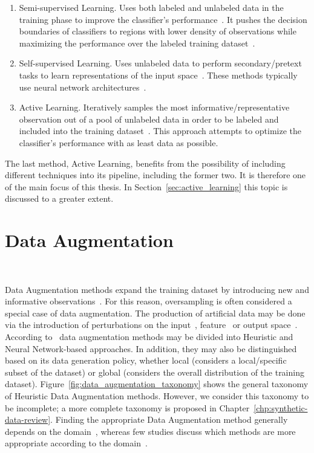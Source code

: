 \begin{enumerate}
    \item Semi-supervised Learning. Uses both labeled and unlabeled data in
        the training phase to improve the classifier's
        performance~\cite{ouali2020overview}. It pushes the decision
        boundaries of classifiers to regions with lower density of
        observations while maximizing the performance over the labeled
        training dataset~\cite{chapelle2009semi}.
    \item Self-supervised Learning. Uses unlabeled data to perform
        secondary/pretext tasks to learn representations of the input
        space~\cite{grill2020bootstrap}. These methods typically use neural
        network architectures~\cite{liu2021self}.
    \item Active Learning. Iteratively samples the most
        informative/representative observation out of a pool of unlabeled data
        in order to be labeled and included into the training
        dataset~\cite{budd2021survey}. This approach attempts to optimize the
        classifier's performance with as least data as possible.
\end{enumerate}

The last method, Active Learning, benefits from the possibility of including
different techniques into its pipeline, including the former two. It is
therefore one of the main focus of this thesis. In
Section~\ref{sec:active_learning} this topic is discussed to a greater extent.

\section{Data Augmentation}~\label{sec:data_augmentation}

Data Augmentation methods expand the training dataset by introducing new and
informative observations~\cite{Behpour2019}. For this reason, oversampling is
often considered a special case of data augmentation. The production of
artificial data may be done via the introduction of perturbations on the
input~\cite{Zhong2020}, feature~\cite{DeVries2017} or output
space~\cite{Behpour2019}. According to~\citet{Shorten2019} data augmentation
methods may be divided into Heuristic and Neural Network-based approaches. In
addition, they may also be distinguished based on its data generation policy,
whether local (considers a local/specific subset of the dataset) or global
(considers the overall distribution of the training dataset).
Figure~\ref{fig:data_augmentation_taxonomy} shows the general taxonomy of
Heuristic Data Augmentation methods. However, we consider this taxonomy to be
incomplete; a more complete taxonomy is proposed in
Chapter~\ref{chp:synthetic-data-review}. Finding the appropriate Data
Augmentation method generally depends on the domain~\cite{DeVries2017},
whereas few studies discuss which methods are more appropriate according to
the domain~\cite{Shorten2019, Iwana2021, Wong2016}.

